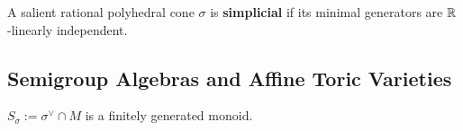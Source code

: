\begin{definition}
  \label{1-2-16-simplicial-cone}

  A salient rational polyhedral cone $\sigma$ is {\bf simplicial} if its minimal generators are ${\mathbb R}$-linearly independent.
\end{definition}


\subsection{Semigroup Algebras and Affine Toric Varieties}


\begin{proposition}
  \label{1-2-17-gordan-lemma}
  \uses{}

  $S_\sigma := \sigma^\vee \cap M$ is a finitely generated monoid.
\end{proposition}

